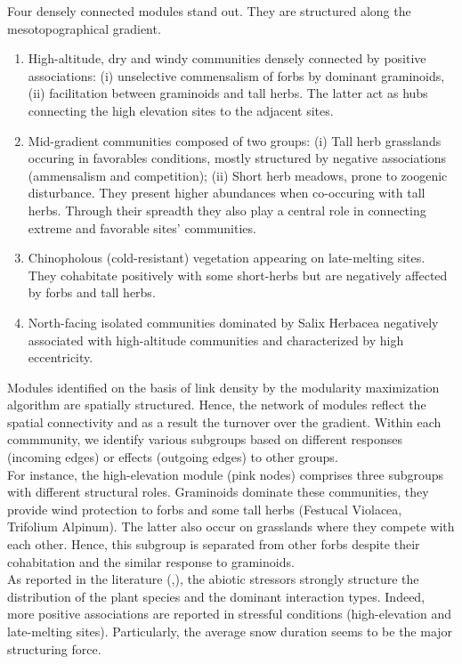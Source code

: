 \documentclass[10pt,a4paper]{article}
\begin{document}
Four densely connected modules stand out. They are structured along the mesotopographical gradient. 
\begin{enumerate}
	\item High-altitude, dry and windy communities densely connected by positive associations: (i) unselective commensalism of forbs by dominant graminoids, (ii) facilitation between graminoids and tall herbs. The latter act as hubs connecting the high elevation sites to the adjacent sites. 
	\item Mid-gradient communities composed of two groups: (i) Tall herb grasslands occuring in favorables conditions, mostly structured by negative associations (ammensalism and competition); (ii) Short herb meadows, prone to zoogenic disturbance. They present higher abundances when co-occuring with tall herbs. Through their spreadth they also play a central role in connecting extreme and favorable sites' communities. 
	\item Chinopholous (cold-resistant) vegetation appearing on late-melting sites. They cohabitate positively with some short-herbs but are negatively affected by forbs and tall herbs. 
	\item North-facing isolated communities dominated by Salix Herbacea negatively associated with high-altitude communities and characterized by high eccentricity.
\end{enumerate}

Modules identified on the basis of link density by the modularity maximization algorithm are spatially structured. Hence, the network of modules reflect the spatial connectivity and as a result the turnover over the gradient. Within each commmunity, we identify various subgroups based on different responses (incoming edges) or effects (outgoing edges) to other groups.\\

For instance, the high-elevation module (pink nodes) comprises three subgroups with different structural roles. Graminoids dominate these communities, they provide wind protection to forbs and some tall herbs (Festucal Violacea, Trifolium Alpinum). The latter also occur on grasslands where they compete with each other. Hence, this subgroup is separated from other forbs despite their cohabitation and the similar response to graminoids.\\ 

As reported in the literature (\cite{callaway2002positive},\cite{choler2005consistent}), the abiotic stressors strongly structure the distribution of the plant species and the dominant interaction types. Indeed, more positive associations are reported in stressful conditions (high-elevation and late-melting sites). Particularly, the average snow duration seems to be the major structuring force. 
     
\end{document}
